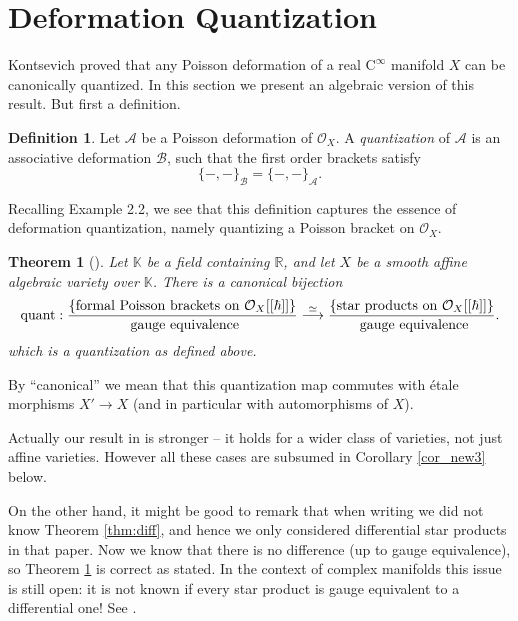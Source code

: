\documentclass{conm-p-l}
\newtheorem{thm}[equation]{Theorem}
\theoremstyle{definition}
\newtheorem{dfn}[equation]{Definition}
\numberwithin{equation}{section}
\newcommand{\iso}{\stackrel{\simeq}{\longrightarrow}}
\newcommand{\opn}{\operatorname}
\newcommand{\mcal}[1]{\mathcal{#1}}
\newcommand{\mrm}[1]{\mathrm{#1}}
\newcommand{\mbb}[1]{\mathbb{#1}}
\newcommand{\tup}[1]{\textup{#1}}
\newcommand{\K}{\mbb{K}}
\begin{document}
\section{Deformation Quantization}

Kontsevich \cite{Ko1} proved that any Poisson deformation of a real 
$\mrm{C}^{\infty}$ manifold $X$ can be canonically quantized. 
In this section we present an algebraic version of this result. But first a
definition. 

\begin{dfn}
Let $\mcal{A}$ be a Poisson deformation of $\mcal{O}_X$. %
A {\em quantization} of $\mcal{A}$ is an 
associative deformation $\mcal{B}$, such that the first order
brackets satisfy
\[ \{ -,- \}_{\mcal{B}} = \{ -,- \}_{\mcal{A}} . \]
\end{dfn} 

Recalling Example 2.2,
we see that this definition captures the essence
of deformation quantization, namely quantizing a Poisson bracket on 
$\mcal{O}_X$.

\begin{thm}[\cite{Ye1}] \label{thm1} 
Let $\K$ be a field containing $\mbb{R}$, and let $X$ be a smooth
affine algebraic variety over $\K$.
There is a canonical bijection
\[ \opn{quant} : \frac{ \{ \tup{formal Poisson brackets on 
$\mcal{O}_{X}[[\hbar]]$} \} }{\tup{ gauge equivalence}} 
\iso
\frac{ \{ \tup{star products on $\mcal{O}_X[[\hbar]]$} \} }
{\tup{ gauge equivalence}} .
 \] 
which is a quantization as defined above. 
\end{thm} 

By ``canonical'' we mean that this quantization map 
commutes with \'etale morphisms $X' \to X$ (and in particular with
automorphisms of $X$).

Actually our result in \cite{Ye1} is stronger -- it holds for a wider
class of varieties, not just affine varieties. 
However all these cases are subsumed in Corollary \ref{cor_new3} below. 

On the other hand, it might be good to remark that when writing \cite{Ye1} we
did not know Theorem \ref{thm:diff}, and hence we only considered differential
star products in that paper. Now we know that there is no difference (up to
gauge equivalence), so Theorem \ref{thm1} is correct as stated. In the context
of complex manifolds  this issue is still open: it is not known if every star
product is gauge equivalent to a differential one! See \cite{KS2}.
\end{document}
